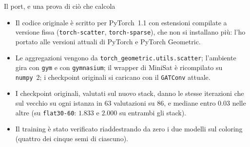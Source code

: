 \documentclass[aspectratio=169]{beamer}
\newcommand{\T}[2]{#2}
\newcommand{\T}[2]{#1}
\begin{document}
\begin{frame}{\T{The port, and a test of what it computes}{Il port, e una prova di ci\`o che calcola}}
  \begin{itemize}
    \item \T{The original code is written for PyTorch~1.1 with pinned compiled extensions
          (\texttt{torch-scatter}, \texttt{torch-sparse}), which can no longer be installed:
          I ported it to the current PyTorch and PyTorch Geometric.}%
          {Il codice originale \`e scritto per PyTorch~1.1 con estensioni compilate a versione
          fissa (\texttt{torch-scatter}, \texttt{torch-sparse}), che non si installano pi\`u:
          l'ho portato alle versioni attuali di PyTorch e PyTorch Geometric.}
    \item \T{The aggregations come from \texttt{torch\_geometric.utils.scatter}; the
          environment runs with \texttt{gym} and \texttt{gymnasium}; the MiniSat wrapper is
          rebuilt against \texttt{numpy}~2; the original checkpoints load with the current
          \texttt{GATConv}.}%
          {Le aggregazioni vengono da \texttt{torch\_geometric.utils.scatter}; l'ambiente gira
          con \texttt{gym} e con \texttt{gymnasium}; il wrapper di MiniSat \`e ricompilato
          su \texttt{numpy}~2; i checkpoint originali si caricano con il \texttt{GATConv}
          attuale.}
    \item \T{The original checkpoints, evaluated on the new stack, give the same iterations
          as on the original one on every instance in 63 of 86 evaluations, and medians within
          $0.03$ in the others (on \texttt{flat30-60}: $1.833$ and $2.000$ on both stacks).}%
          {I checkpoint originali, valutati sul nuovo stack, danno le stesse iterazioni che
          sul vecchio su ogni istanza in 63 valutazioni su 86, e mediane entro $0.03$ nelle
          altre (su \texttt{flat30-60}: $1.833$ e $2.000$ su entrambi gli stack).}
    \item \T{The training path was checked by retraining the two coloring models from scratch
          (four of the five seeds of each).}%
          {Il training \`e stato verificato riaddestrando da zero i due modelli sul coloring
          (quattro dei cinque semi di ciascuno).}
  \end{itemize}
\end{frame}
\end{document}
